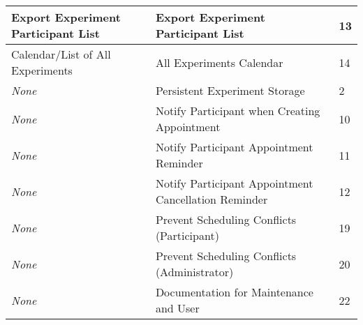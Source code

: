 \begin{table}[!h]
\begin{tabular}{|l|l|l|}
        Export Experiment Participant List & Export Experiment Participant List                   & 13         \\ \hline
        Calendar/List of All Experiments   & All Experiments Calendar                             & 14         \\ \hline
        \emph{None}                        & Persistent Experiment Storage                        & 2          \\ \hline
        \emph{None}                        & Notify Participant when Creating Appointment         & 10         \\ \hline
        \emph{None}                        & Notify Participant Appointment Reminder              & 11         \\ \hline
        \emph{None}                        & Notify Participant Appointment Cancellation Reminder & 12         \\ \hline
        \emph{None}                        & Prevent Scheduling Conflicts (Participant)           & 19         \\ \hline
        \emph{None}                        & Prevent Scheduling Conflicts (Administrator)         & 20         \\ \hline
        \emph{None}                        & Documentation for Maintenance and User               & 22         \\ \hline
    \end{tabular}
\end{table}
